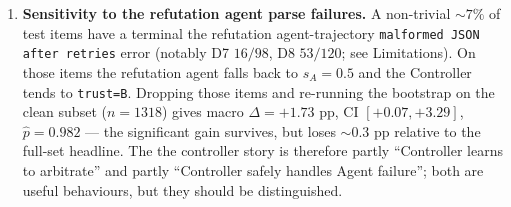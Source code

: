 \begin{enumerate}
\item \textbf{Sensitivity to the refutation agent parse failures.} A non-trivial
$\sim 7\%$ of test items have a terminal the refutation agent-trajectory
\texttt{malformed JSON after retries} error (notably D7 $16/98$,
D8 $53/120$; see Limitations). On those items the refutation agent falls back to
$s_A{=}0.5$ and the Controller tends to \texttt{trust=B}. Dropping
those items and re-running the bootstrap on the clean subset
($n{=}1318$) gives macro $\Delta = +1.73$ pp, CI $[+0.07, +3.29]$,
$\hat p = 0.982$ --- the significant gain survives, but loses
$\sim 0.3$ pp relative to the full-set headline. The the controller story is
therefore partly ``Controller learns to arbitrate'' and partly
``Controller safely handles Agent failure''; both are useful
behaviours, but they should be distinguished.


\end{enumerate}
